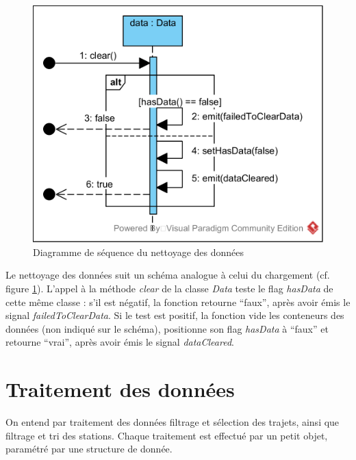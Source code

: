 \documentclass[12pt]{article}
\begin{document}
	\begin{figure}[!h]
	\begin{center}
	\includegraphics[scale=1]{dia_sequence_clear.png}
	\caption{ Diagramme de séquence du nettoyage des données}
	\label{fig:nettoyage}
	\end{center}
	\end{figure}
	
	Le nettoyage des données suit un schéma analogue à celui du chargement (cf. figure \ref{fig:nettoyage}). L’appel à la méthode \textit{clear} de la classe \textit{Data} teste le flag \textit{hasData} de cette même classe : s’il est négatif, la fonction retourne “faux”, après avoir émis le signal \textit{failedToClearData}. Si le test est positif, la fonction vide les conteneurs des données (non indiqué sur le schéma), positionne son flag \textit{hasData} à “faux” et retourne “vrai”, après avoir émis le signal \textit{dataCleared}.

\newpage
	\section{Traitement des données}
	On entend par traitement des données filtrage et sélection des trajets, ainsi que filtrage et tri des stations. Chaque traitement est effectué par un petit objet, paramétré par une structure de donnée.
	
\end{document}
